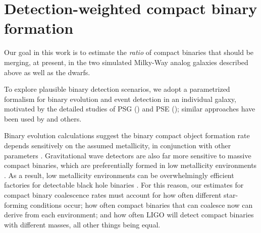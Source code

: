 \documentclass[a4paper,fleqn,usenatbib]{mnras}
\newcommand\abbrvPSgrb{PSG}
\newcommand\abbrvPSellipticals{PSE}
\begin{document}
\section{Detection-weighted compact binary formation}
\label{sec:model}

Our goal in this work is to estimate the \emph{ratio} of compact binaries that should be merging, at present, in the two
simulated Milky-Way analog galaxies described above as well as the dwarfs.

To explore plausible binary detection scenarios, we adopt a parametrized formalism for binary evolution and event
detection in an individual galaxy, motivated by
the detailed studies of  \abbrvPSgrb{} (\cite{PSgrbs-popsyn}) and \abbrvPSellipticals{} (\cite{PSellipticals});  similar approaches have been used by
\cite{2016arXiv160508783L} and others.


Binary evolution calculations suggest the binary compact object formation rate depends sensitively on the assumed metallicity, in conjunction
with other parameters \citep[see,\,e.g.][and references
  therein]{popsyn-LowMetallicityImpact-Chris2008,popsyn-LIGO-SFR-2008,gwastro-EventPopsynPaper-2016}.
Gravitational wave detectors are also far more sensitive to  massive compact binaries, which are  preferentially  formed in low metallicity
environments \citep{PSellipticals,popsyn-LowMetallicityImpact2c-StarTrackRevised-2014}.  As a result, low metallicity
environments can be overwhelmingly efficient factories for detectable black hole binaries
\citep{popsyn-LowMetallicityImpact2c-StarTrackRevised-2014,gwastro-EventPopsynPaper-2016}.  
%
For this reason, our estimates for compact binary coalescence rates must account for how often  different star-forming
conditions occur;  how often compact binaries that can coalesce now can derive from each environment; and how often LIGO will detect compact
binaries with different masses, all other things being equal.
\end{document}
